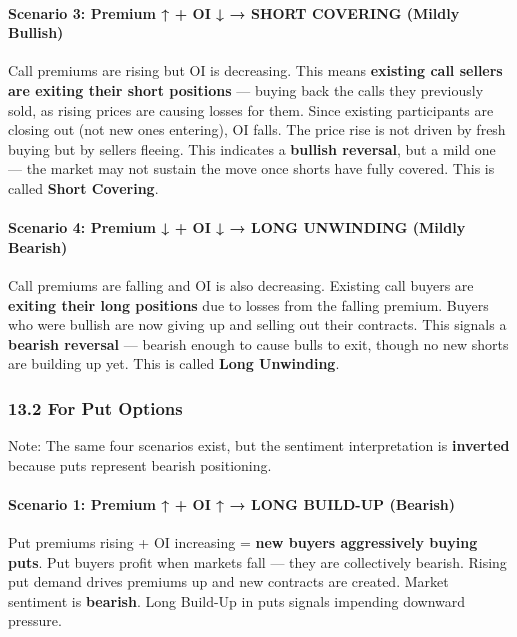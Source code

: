 \documentclass[12pt,openany]{book}
\begin{document}
\paragraph{Scenario 3: Premium ↑ + OI ↓ → SHORT COVERING (Mildly Bullish)}

Call premiums are rising but OI is decreasing. This means \textbf{existing call sellers are exiting their short positions} — buying back the calls they previously sold, as rising prices are causing losses for them. Since existing participants are closing out (not new ones entering), OI falls. The price rise is not driven by fresh buying but by sellers fleeing. This indicates a \textbf{bullish reversal}, but a mild one — the market may not sustain the move once shorts have fully covered. This is called \textbf{Short Covering}.

\paragraph{Scenario 4: Premium ↓ + OI ↓ → LONG UNWINDING (Mildly Bearish)}

Call premiums are falling and OI is also decreasing. Existing call buyers are \textbf{exiting their long positions} due to losses from the falling premium. Buyers who were bullish are now giving up and selling out their contracts. This signals a \textbf{bearish reversal} — bearish enough to cause bulls to exit, though no new shorts are building up yet. This is called \textbf{Long Unwinding}.

\subsubsection{13.2 For Put Options}

Note: The same four scenarios exist, but the sentiment interpretation is \textbf{inverted} because puts represent bearish positioning.

\paragraph{Scenario 1: Premium ↑ + OI ↑ → LONG BUILD-UP (Bearish)}

Put premiums rising + OI increasing = \textbf{new buyers aggressively buying puts}. Put buyers profit when markets fall — they are collectively bearish. Rising put demand drives premiums up and new contracts are created. Market sentiment is \textbf{bearish}. Long Build-Up in puts signals impending downward pressure.
\end{document}
